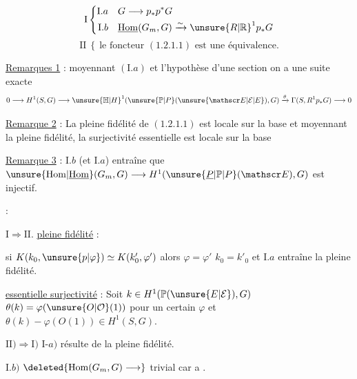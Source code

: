 

\[
\mathrm I\left\{\begin{aligned}
\mathrm I.a\quad & G\longrightarrow p_*p^*G\\
\mathrm I.b\quad & \underline{\mathrm{Hom}}(G_m,G)\xrightarrow{\sim}{\unsure{R|\mathbb R}}^1p_*G
\end{aligned}\right.
\]
\[
\mathrm{II}\ \left\{\ \text{le foncteur $(1.2.1.1)$ est une équivalence.}\right.
\]

\uline{Remarques 1} :  moyennant $(\mathrm I.a)$ et l'hypothèse d'une section
on a une suite exacte
\[
0\longrightarrow H^1(S,G)\longrightarrow {\unsure{\mathbb H|H}}^{1}(\unsure{\mathbb P|P}(\unsure{\mathscr E|\mathcal E|E}),G)
\xrightarrow{\theta}\Gamma(S,R^1p_*G)\longrightarrow0
\]

\uline{Remarque 2} : La pleine fidélité de $(1.2.1.1)$ est locale sur la base et
moyennant la pleine fidélité, la surjectivité essentielle est locale sur la base

\uline{Remarque 3} : $\mathrm I.b$ (et $\mathrm I.a$) entraîne que
$\unsure{\mathrm{Hom}|\underline{\mathrm{Hom}}}(G_m,G)\longrightarrow H^1(\unsure{\underline{P}|\mathbb P|P}(\mathscr E),G)$ est injectif.

 :


$\mathrm I\Rightarrow\mathrm{II}$. \uline{pleine fidélité} :

si $K(k_0,\unsure{p|\varphi})\simeq K(k'_0,\varphi')$ alors $\varphi=\varphi'$
 $k_0=k'_0$ et $\mathrm I.a$ entraîne la pleine fidélité.

\uline{essentielle surjectivité} : Soit $k\in H^1(\mathbb P(\unsure{E|\mathcal E}),G)$
$\theta(k)=\varphi(\unsure{O|\mathcal O}(1))$ pour un certain $\varphi$ et
$\theta(k)-\varphi(O(1))\in H^1(S,G)$.

$\mathrm{II})\Rightarrow\mathrm I)$ \quad $\mathrm I\text{-}a)$ résulte de la pleine fidélité.

$\mathrm I.b)$ \quad $\deleted{\mathrm{Hom}(G_m,G)\longrightarrow}$ trivial car a .

